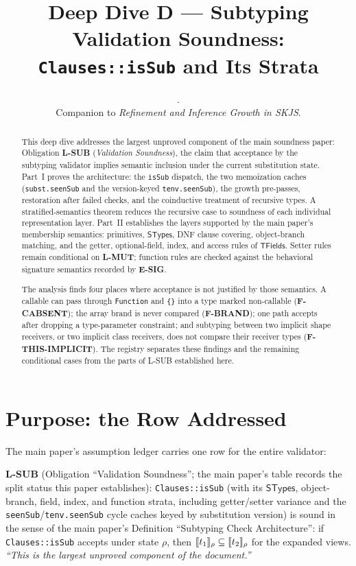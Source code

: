 \documentclass[11pt]{article}
\title{Deep Dive D --- Subtyping Validation Soundness:\\
\texttt{Clauses::isSub} and Its Strata}
\author{}
\date{\skjspin.\\
Companion to \emph{Refinement and Inference Growth in SKJS}.}
\newcommand{\STypes}{\mathsf{STypes}}
\newcommand{\TFields}{\mathsf{TFields}}
\begin{document}
\maketitle

\begin{abstract}
This deep dive addresses the largest unproved component of the main
soundness paper: Obligation \textbf{L-SUB} (\emph{Validation Soundness}),
the claim that acceptance by the subtyping validator implies semantic
inclusion under the current substitution state. Part~I proves the
architecture: the \texttt{isSub} dispatch, the two memoization caches
(\texttt{subst.seenSub} and the version-keyed \texttt{tenv.seenSub}), the
growth pre-passes, restoration after failed checks, and the coinductive
treatment of recursive types. A stratified-semantics theorem reduces the
recursive case to soundness of each individual representation layer. Part~II
establishes the layers supported by the main paper's membership semantics:
primitives, $\STypes$, DNF clause covering, object-branch matching, and the
getter, optional-field, index, and access rules of $\TFields$. Setter rules
remain conditional on \textbf{L-MUT}; function rules are checked against the
behavioral signature semantics recorded by \textbf{E-SIG}.

The analysis finds four places where acceptance is not justified by those
semantics. A callable can pass through \texttt{Function} and \texttt{\{\}}
into a type marked non-callable (\textbf{F-CABSENT}); the array brand is never
compared (\textbf{F-BRAND}); one path accepts after dropping a type-parameter
constraint; and subtyping between two implicit shape receivers, or two
implicit class receivers, does not compare their receiver types
(\textbf{F-THIS-IMPLICIT}). The registry separates these findings and the
remaining conditional cases from the parts of L-SUB established here.
\end{abstract}

\tableofcontents

\section{Purpose: the Row Addressed}
\label{sec:purpose}

The main paper's assumption ledger carries one row for the entire
validator:

\begin{keydef}
\textbf{L-SUB} (Obligation ``Validation Soundness''; the main paper's
table records the split status this paper establishes):
\texttt{Clauses::isSub} (with its $\STypes$, object-branch, field, index,
and function strata, including getter/setter variance and the
\texttt{seenSub}/\texttt{tenv.seenSub} cycle caches keyed by substitution
version) is sound in the sense of the main paper's Definition
``Subtyping Check Architecture'': if \texttt{Clauses::isSub} accepts under
state $\rho$, then $\llbracket t_1 \rrbracket_\rho \subseteq \llbracket t_2 \rrbracket_\rho$ for the
expanded views. \emph{``This is the largest unproved component of the
document.''}
\end{keydef}
\end{document}
